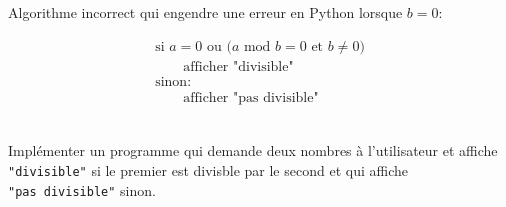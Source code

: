 \documentclass[a4paper,17pt]{extarticle}
\newenvironment{eleve}%
{\begin{activite}\color{noiramu}\\[-0.5cm]}
{\end{activite}}
\begin{document}
\begin{exemple}
Algorithme incorrect qui engendre une erreur en Python lorsque \(b=0\):

\[
\begin{array}{ll}
\text{si $a=0$ ou $\big( a$ mod $b = 0$ et $b \neq 0\big)$}\\
\qquad \text{afficher "divisible"}\\
\text{sinon:}\\
\qquad \text{afficher "pas divisible"}
\end{array}
\]

        \end{exemple}\begin{eleve}
    Implémenter un programme qui demande deux nombres à l'utilisateur et
affiche \texttt{"divisible"} si le premier est divisble par le second et
qui affiche \texttt{"pas\ divisible"} sinon.
        
        \end{eleve}

    
    
    
\end{document}
